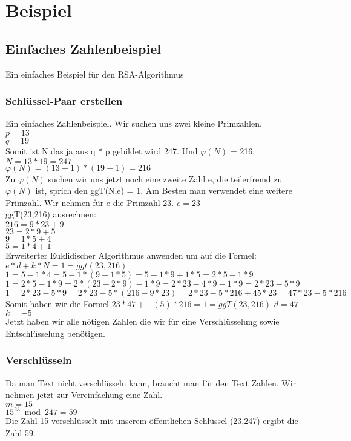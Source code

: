 \section{Beispiel}
\subsection{Einfaches Zahlenbeispiel}
Ein einfaches Beispiel für den RSA-Algorithmus
\subsubsection{Schlüssel-Paar erstellen}
Ein einfaches Zahlenbeispiel. Wir suchen uns zwei kleine Primzahlen.\\
$ p = 13 $ \\
$ q = 19 $ \\
Somit ist N das ja aus q * p gebildet wird 247. Und $ \varphi(N) $ = 216.\\
$ N = 13 * 19 = 247 $ \\
$ \varphi(N) = (13 - 1) * (19 - 1) = 216 $ \\
Zu $ \varphi(N) $ suchen wir uns jetzt noch eine zweite Zahl e, die teilerfremd zu $ \varphi(N) $ ist, sprich den ggT(N,e) = 1. Am Besten man verwendet eine weitere Primzahl. Wir nehmen für e die Primzahl 23.
$ e = 23 $\\
ggT(23,216) ausrechnen:\\
$ 216 = 9 * 23 + 9 $\\
$  23 = 2 *  9 + 5 $\\
$   9 = 1 *  5 + 4 $\\
$   5 = 1 *  4 + 1 $\\
Erweiterter Euklidischer Algorithmus anwenden um auf die Formel:
$e * d + k * N = 1 = ggt(23,216) $\\
$1 = 5 - 1 * 4 = 5 - 1 *(9 - 1 * 5) = 5 - 1*9 + 1 * 5 = 2*5 - 1*9$\\
$1 = 2*5 - 1*9 = 2 *(23 - 2 * 9) - 1*9 = 2*23 - 4*9 - 1*9 = 2*23 - 5*9$\\
$1 = 2*23 - 5*9=2*23 - 5 *(216 - 9 * 23) = 2*23 - 5*216 +45*23 = 47*23 - 5*216 $\\
Somit haben wir die Formel
$ 23 * 47 + -(5) * 216 = 1 = ggT(23,216) $
$ d = 47 $\\
$ k = -5 $\\
Jetzt haben wir alle nötigen Zahlen die wir für eine Verschlüsselung sowie Entschlüsselung benötigen.
\subsubsection{Verschlüsseln}
Da man Text nicht verschlüsseln kann, braucht man für den Text Zahlen. Wir nehmen jetzt zur Vereinfachung eine Zahl.\\
$ m = 15 $ \\
$ 15^{23} \bmod 247 = 59$ \\
Die Zahl 15 verschlüsselt mit unserem öffentlichen Schlüssel (23,247) ergibt die Zahl 59.
